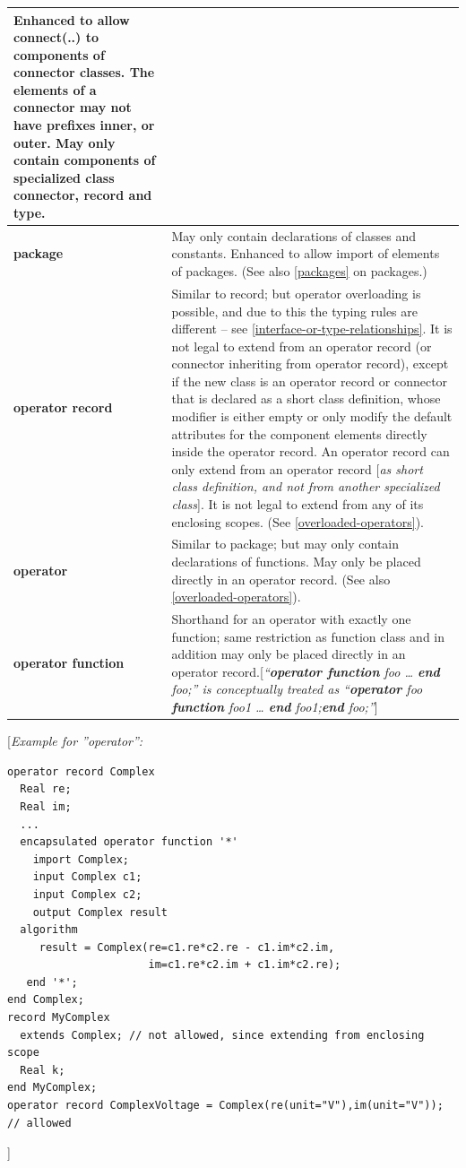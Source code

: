 \documentclass[10pt,a4paper]{report}
\begin{document}
\begin{longtable}{|p{4cm}|p{9cm}|}
Enhanced to allow connect(..) to components of connector classes. The
elements of a connector may not have prefixes inner, or outer. May only
contain components of specialized class connector, record and
type.\\ \hline
\textbf{package} & May only contain declarations of classes and
constants. Enhanced to allow import of elements of packages. (See also
\ref{packages} on packages.)\\ \hline
\textbf{operator record} & Similar to record; but operator overloading
is possible, and due to this the typing rules are different -- see
\ref{interface-or-type-relationships}. It is not legal to extend from an operator record (or
connector inheriting from operator record), except if the new class is
an operator record or connector that is declared as a short class
definition, whose modifier is either empty or only modify the default
attributes for the component elements directly inside the operator
record. An operator record can only extend from an operator record
{[}\emph{as short class definition, and not from another specialized
class}{]}. It is not legal to extend from any of its enclosing scopes.
(See \ref{overloaded-operators}).\\ \hline
\textbf{operator} & Similar to package; but may only contain
declarations of functions. May only be placed directly in an operator
record. (See also \ref{overloaded-operators}).\\ \hline
\textbf{operator function} & Shorthand for an
operator with exactly one function; same restriction as function class
and in addition may only be placed directly in an operator
record.{[}\emph{``\textbf{operator function} foo \ldots{}
\textbf{end} foo;'' is conceptually treated as\newline
``\textbf{operator} foo \textbf{function} foo1 \ldots{} \textbf{end}
foo1;\textbf{end} foo;''}{]}\\ \hline
\end{longtable}

{[}\emph{Example for ''operator'': }
\begin{lstlisting}[language=modelica]
operator record Complex
  Real re;
  Real im;
  ...
  encapsulated operator function '*'
    import Complex;
    input Complex c1;
    input Complex c2;
    output Complex result
  algorithm
     result = Complex(re=c1.re*c2.re - c1.im*c2.im,
                      im=c1.re*c2.im + c1.im*c2.re);
   end '*';
end Complex;
record MyComplex
  extends Complex; // not allowed, since extending from enclosing scope
  Real k;
end MyComplex;
operator record ComplexVoltage = Complex(re(unit="V"),im(unit="V")); // allowed
\end{lstlisting}
{]}
\end{document}
